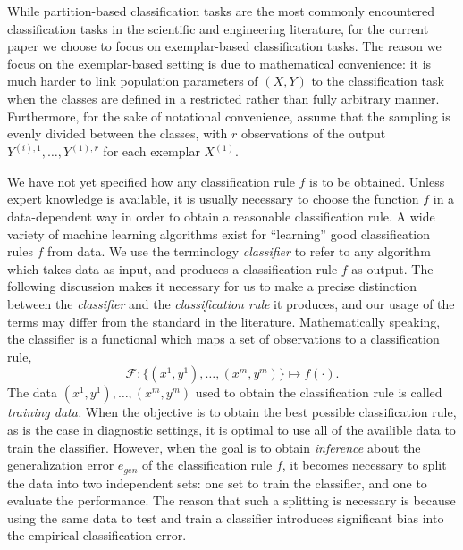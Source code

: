 \documentclass{article}
\begin{document}
While partition-based classification tasks are the most commonly encountered classification tasks
in the scientific and engineering literature, for the current paper we choose to focus on
exemplar-based classification tasks.  The reason we focus on the exemplar-based setting
is due to mathematical convenience: it is much harder to link population parameters of $(X, Y)$
to the classification task when the classes are defined in a restricted rather than fully arbitrary manner.
Furthermore, for the sake of notational convenience, assume that the sampling
is evenly divided between the classes, with $r$ observations of the output $Y^{(i),1},\hdots, Y^{(1), r}$
for each exemplar $X^{(1)}$.


We have not yet specified how any classification rule $f$ is to be
obtained.  Unless expert knowledge is available, it is usually necessary to choose the function $f$ in a
data-dependent way in order to obtain a reasonable classification
rule.  A wide variety of machine learning algorithms exist for
``learning'' good classification rules $f$ from data.  We use the
terminology \emph{classifier} to refer to any algorithm which takes
data as input, and produces a classification rule $f$ as output.  The
following discussion makes it necessary for us to make a precise
distinction between the \emph{classifier} and the \emph{classification
rule} it produces, and our usage of the terms may differ from the
standard in the literature.  Mathematically speaking, the classifier
is a functional which maps a set of observations to a classification
rule,
\[
\mathcal{F}: \{(x^{1},y^{1}),\hdots, (x^{m}, y^{m})\} \mapsto f(\cdot).
\]
The data $(x^1,y^1),\hdots, (x^m, y^m)$ used to obtain the
classification rule is called \emph{training data.}  When the
objective is to obtain the best possible classification rule, as is
the case in diagnostic settings, it is optimal to use all of the
availible data to train the classifier.  However, when the goal is to
obtain \emph{inference} about the generalization error $e_{gen}$ of the classification
rule $f$, it becomes necessary to split the data into two independent sets:
one set to train the classifier, and one to evaluate the performance.
The reason that such a splitting is necessary is because using the
same data to test and train a classifier introduces significant bias
into the empirical classification error.
\end{document}
